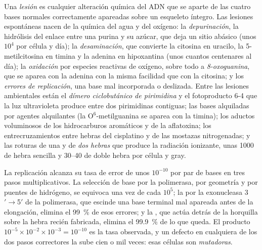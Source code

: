 \begin{definition}\label{def:b3:dna-repair:lesions}
Una \emph{lesión} es cualquier alteración química del ADN que se aparte
de las cuatro bases normales correctamente apareadas sobre un esqueleto
íntegro. Las lesiones espontáneas nacen de la química del agua y del
oxígeno: la \emph{depurinación}, la hidrólisis del enlace entre una
purina y su azúcar, que deja un sitio abásico (unos $10^{4}$ por célula y
día); la \emph{desaminación}, que convierte la citosina en uracilo, la
5-metilcitosina en timina y la adenina en hipoxantina (unos cuantos
centenares al día); la \emph{oxidación} por especies reactivas de
oxígeno, sobre todo a \emph{8-oxoguanina}, que se aparea con la adenina
con la misma facilidad que con la citosina; y los \emph{errores de
replicación}, una base mal incorporada o deslizada. Entre las lesiones
ambientales están el \emph{dímero ciclobutánico de pirimidina} y el
fotoproducto 6-4 que la luz ultravioleta produce entre dos pirimidinas
contiguas; las bases alquiladas por agentes alquilantes (la
O$^{6}$-metilguanina se aparea con la timina); los aductos voluminosos de
los hidrocarburos aromáticos y de la aflatoxina; los entrecruzamientos
entre hebras del cisplatino y de las mostazas nitrogenadas; y las roturas
de una y de \emph{dos hebras} que produce la radiación ionizante, unas
\num{1000} de hebra sencilla y \numrange{30}{40} de doble hebra por
célula y gray.
\end{definition}

\begin{proposition}\label{prop:b3:dna-repair:fidelity}
La replicación alcanza su tasa de error de unos $10^{-10}$ por par de
bases en tres pasos multiplicativos. La selección de base por la
polimerasa, por geometría y por puentes de hidrógeno, se equivoca una vez
de cada $10^{5}$; la \emph{} por la exonucleasa
3$'\to$5$'$ de la polimerasa, que escinde una base terminal mal apareada
antes de la elongación, elimina el \qty{99}{\%} de esos errores; y la
\emph{}, que actúa detrás de la
horquilla sobre la hebra recién fabricada, elimina el \qty{99.9}{\%} de
lo que queda. El producto
$10^{-5}\times 10^{-2}\times 10^{-3} = 10^{-10}$ es la tasa observada,
y un defecto en cualquiera de los dos
pasos correctores la sube cien o mil veces: esas células son
\emph{mutadoras}.
\end{proposition}

